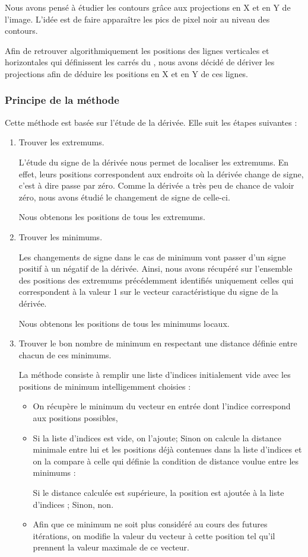 
  Nous avons pensé à étudier les contours grâce aux projections en X et en Y de l'image. 
L'idée est de faire apparaître les pics de pixel noir au niveau des contours. 

  Afin de retrouver algorithmiquement les positions des lignes verticales et horizontales qui définissent les carrés du \rubic{}, 
nous avons décidé de dériver les projections afin de déduire les positions en X et en Y de ces lignes. 

\subsubsection*{Principe de la méthode} 

  Cette méthode est basée sur l'étude de la dérivée. 
Elle suit les étapes suivantes : 
\begin{enumerate}
  \item Trouver les extremums. 

  L'étude du signe de la dérivée nous permet de localiser les extremums. 
En effet, leurs positions correspondent aux endroits où la dérivée change de signe, c'est à dire passe par zéro. 
Comme la dérivée a très peu de chance de valoir zéro, nous avons étudié le changement de signe de celle-ci. 

  Nous obtenons les positions de tous les extremums. 

  \item Trouver les minimums. 

  Les changements de signe dans le cas de minimum vont passer d'un signe positif à un négatif de la dérivée. 
Ainsi, nous avons récupéré sur l'ensemble des positions des extremums précédemment identifiés uniquement celles qui 
correspondent à la valeur 1 sur le vecteur caractéristique du signe de la dérivée. 

  Nous obtenons les positions de tous les minimums locaux. 

  \item Trouver le bon nombre de minimum en respectant une distance définie entre chacun de ces minimums. 
 
La méthode consiste à remplir une liste d'indices initialement vide avec les positions de minimum intelligemment choisies : 
  \begin{itemize}
    \item On récupère le minimum du vecteur en entrée dont l'indice correspond aux positions possibles, 
    \item Si la liste d'indices est vide, on l'ajoute; 
Sinon on calcule la distance minimale entre lui et les positions déjà contenues dans la liste d'indices 
et on la compare à celle qui définie la condition de distance voulue entre les minimums : 

  Si le distance calculée est supérieure, la position est ajoutée à la liste d'indices ; Sinon, non. 
    \item Afin que ce minimum ne soit plus considéré au cours des futures itérations, 
on modifie la valeur du vecteur à cette position tel qu'il prennent la valeur maximale de ce vecteur. 
  \end{itemize}
\end{enumerate}

